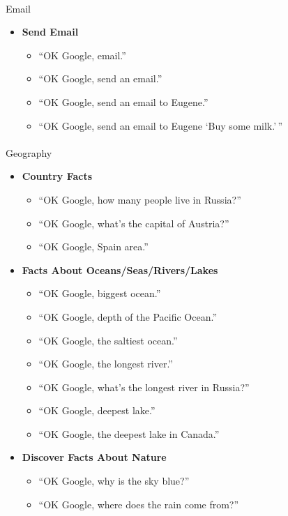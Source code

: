 \documentclass[
  a4paper,
]{article}
\makeatletter
\let\oldparagraph\paragraph
\renewcommand{\paragraph}{
    \@ifstar
      \xxxParagraphStar
      \xxxParagraphNoStar
  }
\newcommand{\xxxParagraphStar}[1]{\oldparagraph*{#1}\mbox{}}
\newcommand{\xxxParagraphNoStar}[1]{\oldparagraph{#1}\mbox{}}
\providecommand{\tightlist}{%
  \setlength{\itemsep}{0pt}\setlength{\parskip}{0pt}}\usepackage{longtable,booktabs,array}
\makeatother
\begin{document}
\paragraph{Email}\label{email}

\begin{itemize}
\tightlist
\item
  \textbf{Send Email}

  \begin{itemize}
  \tightlist
  \item
    ``OK Google, email.''
  \item
    ``OK Google, send an email.''
  \item
    ``OK Google, send an email to Eugene.''
  \item
    ``OK Google, send an email to Eugene `Buy some milk.'\,''
  \end{itemize}
\end{itemize}

\paragraph{Geography}\label{geography}

\begin{itemize}
\tightlist
\item
  \textbf{Country Facts}

  \begin{itemize}
  \tightlist
  \item
    ``OK Google, how many people live in Russia?''
  \item
    ``OK Google, what's the capital of Austria?''
  \item
    ``OK Google, Spain area.''
  \end{itemize}
\item
  \textbf{Facts About Oceans/Seas/Rivers/Lakes}

  \begin{itemize}
  \tightlist
  \item
    ``OK Google, biggest ocean.''
  \item
    ``OK Google, depth of the Pacific Ocean.''
  \item
    ``OK Google, the saltiest ocean.''
  \item
    ``OK Google, the longest river.''
  \item
    ``OK Google, what's the longest river in Russia?''
  \item
    ``OK Google, deepest lake.''
  \item
    ``OK Google, the deepest lake in Canada.''
  \end{itemize}
\item
  \textbf{Discover Facts About Nature}

  \begin{itemize}
  \tightlist
  \item
    ``OK Google, why is the sky blue?''
  \item
    ``OK Google, where does the rain come from?''
  \end{itemize}
\end{itemize}
\end{document}
